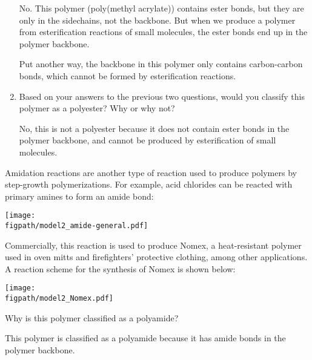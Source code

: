 \begin{activity}
\begin{ctqs}
\begin{enumerate}
				\begin{solution}[2in]
					No.  This polymer (poly(methyl acrylate)) contains ester bonds, but they are only in the sidechains, not the backbone.  But when we produce a polymer from esterification reactions of small molecules, the ester bonds end up in the polymer backbone.
					
					Put another way, the backbone in this polymer only contains carbon-carbon bonds, which cannot be formed by esterification reactions.
				\end{solution}
			
			\item Based on your answers to the previous two questions, would you classify this polymer as a polyester?  Why or why not?
			
				\begin{solution}[2in]
					No, this is not a polyester because it does not contain ester bonds in the polymer backbone, and cannot be produced by esterification of small molecules.
				\end{solution}
			
		\end{enumerate}
		
\end{ctqs}
	

\clearpage
\begin{model}

Amidation reactions are another type of reaction used to produce polymers by step-growth polymerizations.
For example, acid chlorides can be reacted with primary amines to form an amide bond:
	
	\centerline{\texttt{[image: \\figpath/model2\_amide-general.pdf]}}

Commercially, this reaction is used to produce Nomex, a heat-resistant polymer used in oven mitts and firefighters' protective clothing, among other applications.
A reaction scheme for the synthesis of Nomex is shown below:
	
	\centerline{\texttt{[image: \\figpath/model2\_Nomex.pdf]}}

\end{model}

\begin{ctqs}
		\question Why is this polymer classified as a polyamide?
			
				\begin{solution}[1.5in]
					This polymer is classified as a polyamide because it has amide bonds in the polymer backbone.
				\end{solution}
		

\end{ctqs}
\end{activity}
